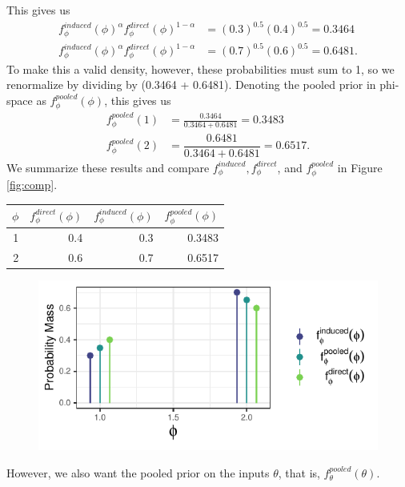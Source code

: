\documentclass[12pt,twoside]{smiththesis}
\begin{document}
This gives us
\begin{align*}
f_\phi^{induced}(\phi)^{\alpha} f_\phi^{direct}(\phi)^{1-\alpha} &= (0.3)^{0.5}(0.4)^{0.5} = 0.3464\\
f_\phi^{induced}(\phi)^{\alpha} f_\phi^{direct}(\phi)^{1-\alpha} &= (0.7)^{0.5}(0.6)^{0.5} = 0.6481.
\end{align*}
To make this a valid density, however, these probabilities must sum to 1, so we renormalize by dividing by (0.3464 + 0.6481). Denoting the pooled prior in phi-space as \(f_\phi^{pooled}(\phi)\), this gives us
\begin{align*}
f_\phi^{pooled}(1) &= \frac{ 0.3464  }  { 0.3464 + 0.6481 } = 0.3483 \\
f_\phi^{pooled}(2) &= \dfrac{ 0.6481 } { 0.3464 + 0.6481}  =0.6517.
\end{align*}
We summarize these results and compare \(f_\phi^{induced}, f_\phi^{direct}\), and \(f_\phi^{pooled}\) in Figure \ref{fig:comp}.
\begin{multicols}{2}
\begin{table}[H]
\centering
\begin{tabular}[t]{r|r|r|r}
\hline
$\phi$ & $f_\phi^{direct}(\phi)$ & $f_\phi^{induced}(\phi)$ & $f_\phi^{pooled}(\phi)$\\
\hline
1 & 0.4 & 0.3 & 0.3483\\
\hline
2 & 0.6 & 0.7 & 0.6517\\
\hline
\end{tabular}
\end{table}
\columnbreak
\begin{figure}

{\centering \includegraphics[width=1\linewidth]{thesis_files/figure-latex/unnamed-chunk-7-1} 

}

\caption{\label{fig:comp}}\label{fig:unnamed-chunk-7}
\end{figure}
\end{multicols}
However, we also want the pooled prior on the inputs \(\theta\), that is, \(f_\theta^{pooled}(\theta)\).
\end{document}
